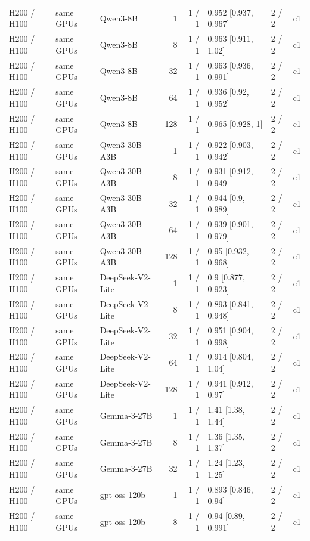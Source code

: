 \begin{longtable}{lllrrlll}
H200 / H100 & same GPUs & Qwen3-8B & 1 & 1 / 1 & 0.952 {[}0.937, 0.967{]} & 2 / 2 & c1 \\
H200 / H100 & same GPUs & Qwen3-8B & 8 & 1 / 1 & 0.963 {[}0.911, 1.02{]} & 2 / 2 & c1 \\
H200 / H100 & same GPUs & Qwen3-8B & 32 & 1 / 1 & 0.963 {[}0.936, 0.991{]} & 2 / 2 & c1 \\
H200 / H100 & same GPUs & Qwen3-8B & 64 & 1 / 1 & 0.936 {[}0.92, 0.952{]} & 2 / 2 & c1 \\
H200 / H100 & same GPUs & Qwen3-8B & 128 & 1 / 1 & 0.965 {[}0.928, 1{]} & 2 / 2 & c1 \\
H200 / H100 & same GPUs & Qwen3-30B-A3B & 1 & 1 / 1 & 0.922 {[}0.903, 0.942{]} & 2 / 2 & c1 \\
H200 / H100 & same GPUs & Qwen3-30B-A3B & 8 & 1 / 1 & 0.931 {[}0.912, 0.949{]} & 2 / 2 & c1 \\
H200 / H100 & same GPUs & Qwen3-30B-A3B & 32 & 1 / 1 & 0.944 {[}0.9, 0.989{]} & 2 / 2 & c1 \\
H200 / H100 & same GPUs & Qwen3-30B-A3B & 64 & 1 / 1 & 0.939 {[}0.901, 0.979{]} & 2 / 2 & c1 \\
H200 / H100 & same GPUs & Qwen3-30B-A3B & 128 & 1 / 1 & 0.95 {[}0.932, 0.968{]} & 2 / 2 & c1 \\
H200 / H100 & same GPUs & DeepSeek-V2-Lite & 1 & 1 / 1 & 0.9 {[}0.877, 0.923{]} & 2 / 2 & c1 \\
H200 / H100 & same GPUs & DeepSeek-V2-Lite & 8 & 1 / 1 & 0.893 {[}0.841, 0.948{]} & 2 / 2 & c1 \\
H200 / H100 & same GPUs & DeepSeek-V2-Lite & 32 & 1 / 1 & 0.951 {[}0.904, 0.998{]} & 2 / 2 & c1 \\
H200 / H100 & same GPUs & DeepSeek-V2-Lite & 64 & 1 / 1 & 0.914 {[}0.804, 1.04{]} & 2 / 2 & c1 \\
H200 / H100 & same GPUs & DeepSeek-V2-Lite & 128 & 1 / 1 & 0.941 {[}0.912, 0.97{]} & 2 / 2 & c1 \\
H200 / H100 & same GPUs & Gemma-3-27B & 1 & 1 / 1 & 1.41 {[}1.38, 1.44{]} & 2 / 2 & c1 \\
H200 / H100 & same GPUs & Gemma-3-27B & 8 & 1 / 1 & 1.36 {[}1.35, 1.37{]} & 2 / 2 & c1 \\
H200 / H100 & same GPUs & Gemma-3-27B & 32 & 1 / 1 & 1.24 {[}1.23, 1.25{]} & 2 / 2 & c1 \\
H200 / H100 & same GPUs & gpt-oss-120b & 1 & 1 / 1 & 0.893 {[}0.846, 0.94{]} & 2 / 2 & c1 \\
H200 / H100 & same GPUs & gpt-oss-120b & 8 & 1 / 1 & 0.94 {[}0.89, 0.991{]} & 2 / 2 & c1 \\

\end{longtable}
